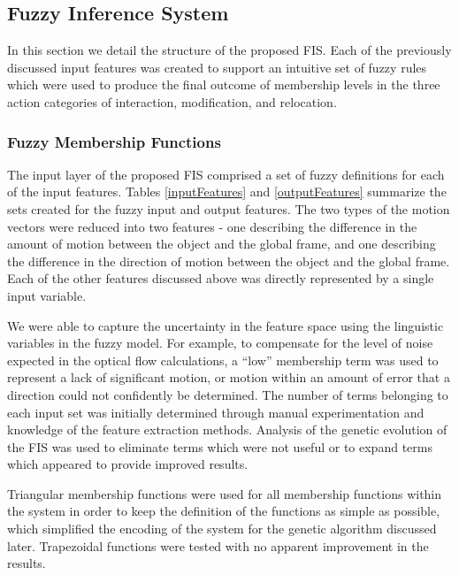 \documentclass[12pt]{report}
\begin{document}
\subsection{Fuzzy Inference System}
In this section we detail the structure of the proposed FIS. Each of the previously discussed input features was created to support an intuitive set of fuzzy rules which were used to produce the final outcome of membership levels in the three action categories of interaction, modification, and relocation.

\subsubsection{Fuzzy Membership Functions}
The input layer of the proposed FIS comprised a set of fuzzy definitions for each of the input features. Tables \ref{inputFeatures} and \ref{outputFeatures} summarize the sets created for the fuzzy input and output features. The two types of the motion vectors were reduced into two features - one describing the difference in the amount of motion between the object and the global frame, and one describing the difference in the direction of motion between the object and the global frame. Each of the other features discussed above was directly represented by a single input variable. 

We were able to capture the uncertainty in the feature space using the linguistic variables in the fuzzy model. For example, to compensate for the level of noise expected in the optical flow calculations, a ``low'' membership term was used to represent a lack of significant motion, or motion within an amount of error that a direction could not confidently be determined. The number of terms belonging to each input set was initially determined through manual experimentation and knowledge of the feature extraction methods. Analysis of the genetic evolution of the FIS was used to eliminate terms which were not useful or to expand terms which appeared to provide improved results.

Triangular membership functions were used for all membership functions within the system in order to keep the definition of the functions as simple as possible, which simplified the encoding of the system for the genetic algorithm discussed later. Trapezoidal functions were tested with no apparent improvement in the results.
\end{document}
